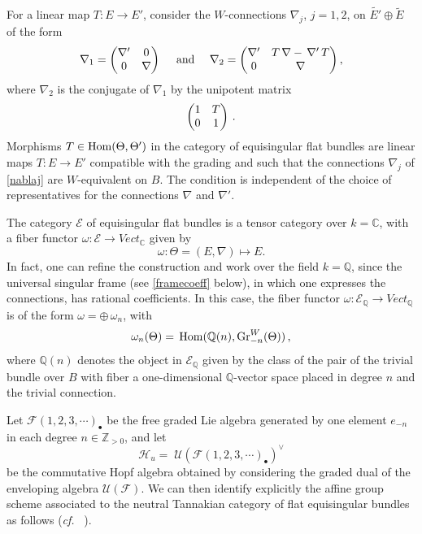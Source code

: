 \documentclass[10pt]{amsart}
\def\C{{\mathbb C}}
\def\Q{{\mathbb Q}}
\def\Z{{\mathbb Z}}
\newcommand{\scr}{\mathcal}
\def\Ec{{\mathcal E}}
\newcommand{\cF}{\scr{F}}
\def\Hc{{\mathcal H}}
\newcommand{\cU}{\scr{U}}
\def\text{\hbox}
\def\Gr{{\rm Gr}}
\newcommand{\cf}{{\it cf.\/}\ }
\numberwithin{equation}{section}
\begin{document}
For a linear map $T: E\to E'$, consider the $W$-connections
$\nabla_j$, $j=1,2$, on $\tilde{E'}\oplus \tilde{E}$ of the form
\begin{equation}\label{nablaj}
\nabla_1 = \left( \begin{matrix}\nabla' &0 \cr 0 &\nabla \cr
\end{matrix} \right) \ \ \ \text{ and } \ \ \
 \nabla_2 = \left( \begin{matrix}\nabla' &T\,\nabla-\,\nabla'\,T
\cr 0 &\nabla \cr \end{matrix} \right),
\end{equation}
where $\nabla_2$ is the conjugate of $\nabla_1$ by the unipotent
matrix
$$
\left( \begin{matrix}1 &T \cr 0 &1 \cr \end{matrix}\right)\,.
$$
Morphisms $T\in{\rm Hom}(\Theta, \Theta')$ in the category of
equisingular flat bundles are linear maps $T: E\to E'$ compatible
with the grading and such that the connections $\nabla_j$ of
\eqref{nablaj} are $W$-equivalent on $B$. The condition is
independent of the choice of representatives for the connections
$\nabla$ and $\nabla'$.

\smallskip

The category $\Ec$ of equisingular flat bundles is a tensor
category over $k=\C$, with a fiber functor $\omega: \Ec \to
Vect_\C$ given by
\begin{equation}\label{omegaE}
 \omega: \Theta=(E,\nabla) \mapsto E.
\end{equation}
In fact, one can refine the construction and work over the field
$k=\Q$, since the universal singular frame (see \eqref{framecoeff} below),
in which one expresses the connections, has rational
coefficients. In this case, the fiber functor $\omega: \Ec_\Q \to
Vect_\Q$ is of the form $\omega = \oplus \,\omega_n$, with
$$
\omega_n(\Theta)=\,{\rm Hom}(\Q(n), \Gr_{-n}^W(\Theta))\,,
$$
where $\Q(n)$ denotes the object in $\Ec_\Q$ given by the class of
the pair of the trivial bundle over $B$ with fiber a
one-dimensional $\Q$-vector space placed in degree $n$ and the
trivial connection.

\smallskip


Let $\cF(1,2,3,\cdots)_{\bullet}$ be the free graded Lie algebra
generated by one element $e_{-n}$ in each degree $n\in \Z_{>0}$,
and let
\begin{equation}\label{hopfu}
\Hc_u=\; \cU(\cF(1,2,3,\cdots)_{\bullet})^\vee
\end{equation}
be the commutative Hopf algebra obtained by considering the graded
dual of the enveloping algebra $\cU(\cF)$. We can then identify
explicitly the affine group scheme associated to the neutral
Tannakian category of flat equisingular bundles as follows (\cf
\cite{cmln} \cite{CM2}).
\end{document}
